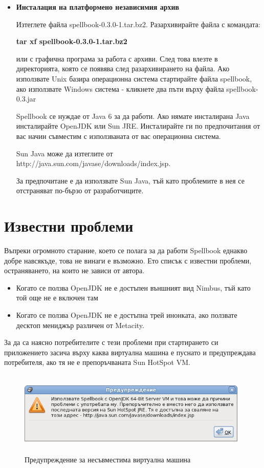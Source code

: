 \begin{itemize}
    \item \textbf{Инсталация на платформено независимия архив}

      Изтеглете файла spellbook-0.3.0-1.tar.bz2. Разархивирайте файла с
    командата:

    \textbf{tar xf spellbook-0.3.0-1.tar.bz2}

    или с графична програма за работа с архиви. След това влезте в
    директорията, която се появява след разархивирането на файла. Ако
    използвате Unix базира операционна система стартирайте файла
    spellbook, ако използвате Windows система - кликнете два пъти
    върху файла spellbook-0.3.jar

    Spellbook се нуждае от Java 6 за да работи. Ако нямате инсталирана
    Java инсталирайте OpenJDK или Sun JRE. Инсталирайте ги по
    предпочитания от вас начин съвместим с използваната от вас
    операционна система.

    Sun Java може да изтеглите от
    http://java.sun.com/javase/downloads/index.jsp. 

    За предпочитане е да използвате Sun Java, тъй като проблемите в
    нея се отстраняват по-бързо от разработчиците.
\end{itemize}
\section{Известни проблеми}
Въпреки огромното старание, което се полага за да работи Spellbook
еднакво добре навсякъде, това не винаги е възможно. Ето списък с
известни проблеми, остраняването, на които не зависи от автора.
\begin{itemize}
  \item Когато се ползва OpenJDK не е достъпен външният вид Nimbus,
    тъй като той още не е включен там
  \item Когато се ползва OpenJDK не е достъпна трей инонката, ако
    ползвате десктоп мениджър различен от Metacity.
\end{itemize}
За да са наясно потребителите с тези проблеми при стартирането си
приложението засича върху каква виртуална машина е пуснато и
предупреждава потребителя, ако тя не е препоръчваната Sun HotSpot VM.
\begin{figure}[htbp]
  \caption{Предупреждение за несъвместима виртуална машина}
  \centering
  \includegraphics[width=110mm, height=40mm]{images/jre_warning.png}
\end{figure}
